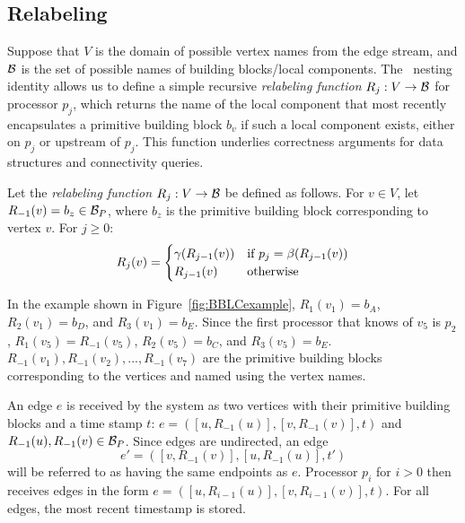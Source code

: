 \subsection{Relabeling}
\label{sec:relabeling}
Suppose that $V$ is the domain of possible vertex names from the edge 
stream,  and ${\cal B}$ is the set of possible names of building blocks/local
components.
The \XStream \ nesting identity allows us to define a simple recursive \emph{relabeling function} $R_j : V \rightarrow {\cal B}$ for processor $p_j$, which returns the name of the local component that most recently encapsulates a primitive building block $b_v$ if such a local component exists, either on $p_j$ or upstream of $p_j$.  This function underlies correctness arguments
for \XStream data structures and connectivity queries.
 \begin{definition}
 Let the \emph{relabeling function} $R_j: V \rightarrow {\cal B}$ be defined as follows. For $v \in V$, let $R_{-1}(v) =b_z \in {\cal B}_P$, where $b_z$ is the primitive building block corresponding to vertex $v$.
For $j \geq 0$:
\begin{equation}
R_j(v) = \begin{cases}
         \gamma(R_{j-1}(v) )& \text{if $p_j=\beta(R_{j-1}(v))$} \\
         R_{j-1}(v) & \text{otherwise}
	\end{cases}
\end{equation}
\end{definition}



In the example shown in Figure~\ref{fig:BBLCexample}, $R_1(v_1)= b_A$, $R_2(v_1) = b_D$, and $R_3(v_1) = b_E$. Since the first processor that knows of $v_5$ is $p_2$, $R_1(v_5) = R_{-1}(v_5)$, $R_2(v_5) = b_C$, and $R_3(v_5) = b_E$. $R_{-1}(v_1),R_{-1}(v_2),...,R_{-1}(v_7)$ are the primitive building blocks corresponding to the vertices and named using the vertex names. 

An edge $e$ is received by the system as two vertices with their primitive building blocks and a time stamp $t$: $e=([u,R_{-1}(u)],[v,R_{-1}(v)],t)$ and $R_{-1}(u),R_{-1}(v) \in {\cal B}_P$. Since edges are undirected, an edge \[e'=([v,R_{-1}(v)],[u,R_{-1}(u)],t')\] will be referred to as having the same endpoints as $e$. Processor $p_i$ for $i>0$ then receives edges in the form $e = ([u,R_{i-1}(u)],[v,R_{i-1}(v)],t)$. For all edges, the most recent timestamp is stored. 

